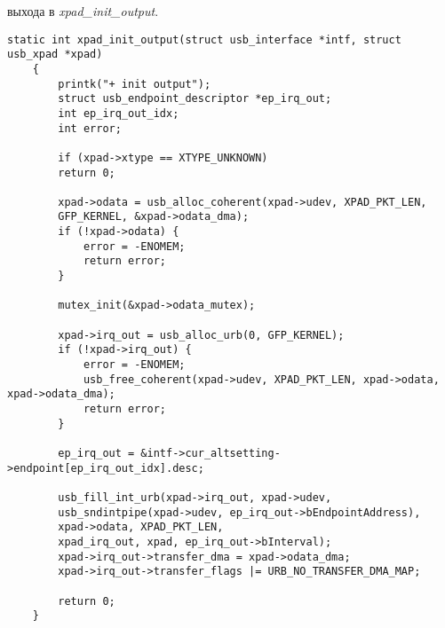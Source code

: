 выхода в  \textit{xpad\_init\_output}.
 \begin{lstlisting}[caption=Инициализация функций выхода]
	static int xpad_init_output(struct usb_interface *intf, struct usb_xpad *xpad)
	{
		printk("+ init output");
		struct usb_endpoint_descriptor *ep_irq_out;
		int ep_irq_out_idx;
		int error;
		
		if (xpad->xtype == XTYPE_UNKNOWN)
		return 0;
		
		xpad->odata = usb_alloc_coherent(xpad->udev, XPAD_PKT_LEN,
		GFP_KERNEL, &xpad->odata_dma);
		if (!xpad->odata) {
			error = -ENOMEM;
			return error;
		}
		
		mutex_init(&xpad->odata_mutex);
		
		xpad->irq_out = usb_alloc_urb(0, GFP_KERNEL);
		if (!xpad->irq_out) {
			error = -ENOMEM;
			usb_free_coherent(xpad->udev, XPAD_PKT_LEN, xpad->odata, xpad->odata_dma);
			return error;
		}
		
		ep_irq_out = &intf->cur_altsetting->endpoint[ep_irq_out_idx].desc;
		
		usb_fill_int_urb(xpad->irq_out, xpad->udev,
		usb_sndintpipe(xpad->udev, ep_irq_out->bEndpointAddress),
		xpad->odata, XPAD_PKT_LEN,
		xpad_irq_out, xpad, ep_irq_out->bInterval);
		xpad->irq_out->transfer_dma = xpad->odata_dma;
		xpad->irq_out->transfer_flags |= URB_NO_TRANSFER_DMA_MAP;
		
		return 0;
	}
\end{lstlisting}


